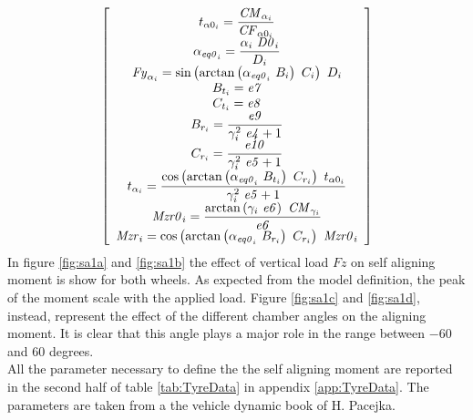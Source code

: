 %
\begin{equation}
    \left[ \begin{array}{c} 
    \displaystyle t_{\alpha0_{i}} =\frac{{\it CM}_{\alpha_{i}}
    }{{\it CF}_{\alpha0_{i}} }\\ \displaystyle \alpha_{{\it eq0}_{i}}
    =\frac{\alpha_{i} ~{\it D0}_{i} }{D_{i} }\\ {\it Fy
   }_{\alpha_{i}} =\sin \left(\arctan \left(\alpha_{{\it eq0}_{i}} ~B_{i}
    \right)~C_{i} \right)~D_{i} \\ B_{t_{i}} ={\it e7} 
   \\ C_{t_{i}} ={\it e8} \\ \displaystyle B_{r_{i}
   } =\frac{{\it e9} }{\gamma_{i} ^{2}~{\it e4} +1}\\ \displaystyle C
   _{r_{i}} =\frac{{\it e10} }{\gamma_{i} ^{2}~{\it e5} +1}
   \\ \displaystyle t_{\alpha_{i}} =\frac{\cos \left(\arctan \left(
   \alpha_{{\it eq0}_{i}} ~B_{t_{i}} \right)~C_{r_{i}} \right)~t_{\alpha0
   _{i}} }{\gamma_{i} ^{2}~{\it e5} +1}\\ \displaystyle {\it Mzr0}_{i
   } =\frac{\arctan \left(\gamma_{i} ~{\it e6} \right)~{\it CM}_{\gamma_{
   i}} }{{\it e6} }\\ {\it Mzr}_{i} =\cos \left(
   \arctan \left(\alpha_{{\it eq0}_{i}} ~B_{r_{i}} \right)~C_{r_{i}} 
   \right)~{\it Mzr0}_{i} 
    \end{array} \right]    
\end{equation}
%
In figure \ref{fig:sa1a} and \ref{fig:sa1b} the effect of vertical load $Fz$ on self aligning moment is show for both wheels. As expected from the model definition, the peak of the moment scale with the applied load. Figure \ref{fig:sa1c} and \ref{fig:sa1d}, instead, represent the effect of the different chamber angles on the aligning moment. It is clear that this angle plays a major role in the range between $-60$ and $60$ degrees.\\
All the parameter necessary to define the the self aligning moment are reported in the second half of table \ref{tab:TyreData} in appendix \ref{app:TyreData}. The parameters are taken from a the vehicle dynamic book of H. Pacejka.\cite{pacejka2012tire}\\
%
